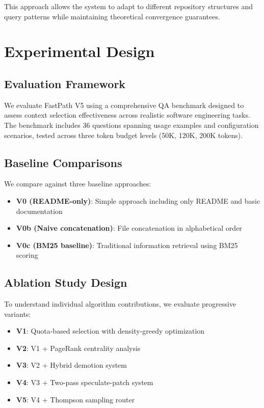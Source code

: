 \documentclass[conference]{IEEEtran}
\begin{document}
This approach allows the system to adapt to different repository structures and query patterns while maintaining theoretical convergence guarantees.

\section{Experimental Design}

\subsection{Evaluation Framework}

We evaluate FastPath V5 using a comprehensive QA benchmark designed to assess context selection effectiveness across realistic software engineering tasks. The benchmark includes 36 questions spanning usage examples and configuration scenarios, tested across three token budget levels (50K, 120K, 200K tokens).

\subsection{Baseline Comparisons}

We compare against three baseline approaches:
\begin{itemize}
\item \textbf{V0 (README-only)}: Simple approach including only README and basic documentation
\item \textbf{V0b (Naive concatenation)}: File concatenation in alphabetical order
\item \textbf{V0c (BM25 baseline)}: Traditional information retrieval using BM25 scoring
\end{itemize}

\subsection{Ablation Study Design}

To understand individual algorithm contributions, we evaluate progressive variants:
\begin{itemize}
\item \textbf{V1}: Quota-based selection with density-greedy optimization
\item \textbf{V2}: V1 + PageRank centrality analysis  
\item \textbf{V3}: V2 + Hybrid demotion system
\item \textbf{V4}: V3 + Two-pass speculate-patch system
\item \textbf{V5}: V4 + Thompson sampling router
\end{itemize}
\end{document}
